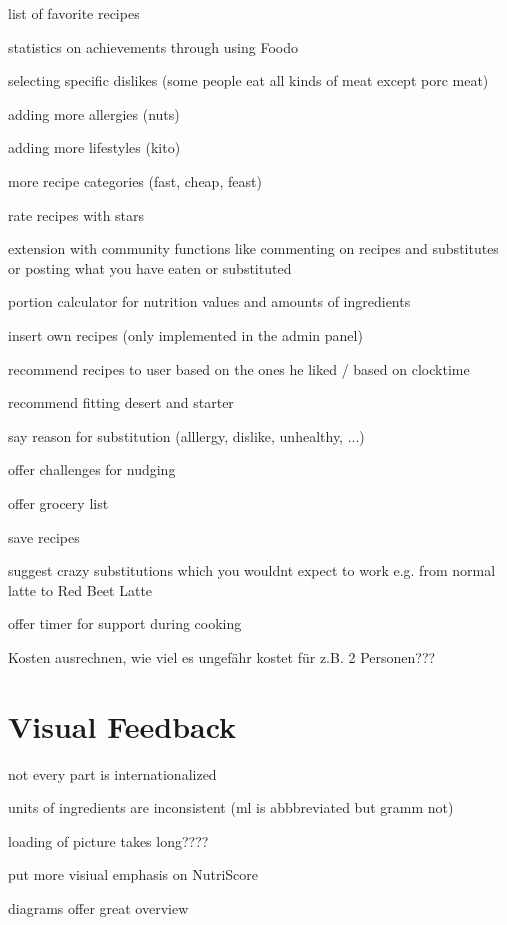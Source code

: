 list of favorite recipes

statistics on achievements through using Foodo

selecting specific dislikes (some people eat all kinds of meat except porc meat)


adding more allergies (nuts) 

adding more lifestyles (kito)

more recipe categories (fast, cheap, feast)

rate recipes with stars

extension with community functions like commenting on recipes and substitutes or posting what you have eaten or substituted

portion calculator for nutrition values and amounts of ingredients

insert own recipes (only implemented in the admin panel)

recommend recipes to user based on the ones he liked / based on clocktime

recommend fitting desert and starter

say reason for substitution (alllergy, dislike, unhealthy, ...)

offer challenges for nudging

offer grocery list

save recipes

suggest crazy substitutions which you wouldnt expect to work e.g. from normal latte to  Red Beet Latte

offer timer for support during cooking

Kosten ausrechnen, wie viel es ungefähr kostet für z.B. 2 Personen???
    
\section{Visual Feedback}


not every part is internationalized

units of ingredients are inconsistent (ml is abbbreviated but gramm not)

loading of picture takes long????

put more visiual emphasis on NutriScore

diagrams offer great overview


